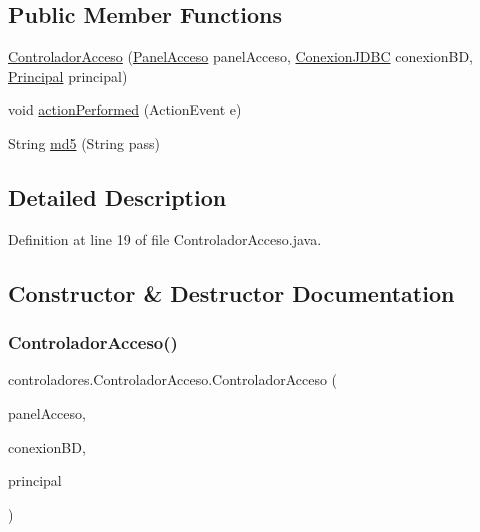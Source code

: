 \subsection*{Public Member Functions}
\begin{DoxyCompactItemize}
\item 
\mbox{\hyperlink{classcontroladores_1_1_controlador_acceso_ac9e7e1075d18fe14a6eb23ebcfb7b169}{Controlador\+Acceso}} (\mbox{\hyperlink{classpaneles_1_1_panel_acceso}{Panel\+Acceso}} panel\+Acceso, \mbox{\hyperlink{classmysql_1_1_conexion_j_d_b_c}{Conexion\+J\+D\+BC}} conexion\+BD, \mbox{\hyperlink{classvistas_1_1_principal}{Principal}} principal)
\item 
void \mbox{\hyperlink{classcontroladores_1_1_controlador_acceso_ab61e9c919427421412501af1772a005a}{action\+Performed}} (Action\+Event e)
\item 
String \mbox{\hyperlink{classcontroladores_1_1_controlador_acceso_a935597b08e48ed6c762ee91ad7e0f5ea}{md5}} (String pass)
\end{DoxyCompactItemize}


\subsection{Detailed Description}


Definition at line 19 of file Controlador\+Acceso.\+java.



\subsection{Constructor \& Destructor Documentation}
\mbox{\label{classcontroladores_1_1_controlador_acceso_ac9e7e1075d18fe14a6eb23ebcfb7b169}} 
\subsubsection{\texorpdfstring{Controlador\+Acceso()}{ControladorAcceso()}}
{\footnotesize\ttfamily controladores.\+Controlador\+Acceso.\+Controlador\+Acceso (\begin{DoxyParamCaption}\item[{\mbox{\hyperlink{classpaneles_1_1_panel_acceso}{Panel\+Acceso}}}]{panel\+Acceso,  }\item[{\mbox{\hyperlink{classmysql_1_1_conexion_j_d_b_c}{Conexion\+J\+D\+BC}}}]{conexion\+BD,  }\item[{\mbox{\hyperlink{classvistas_1_1_principal}{Principal}}}]{principal }\end{DoxyParamCaption})}



